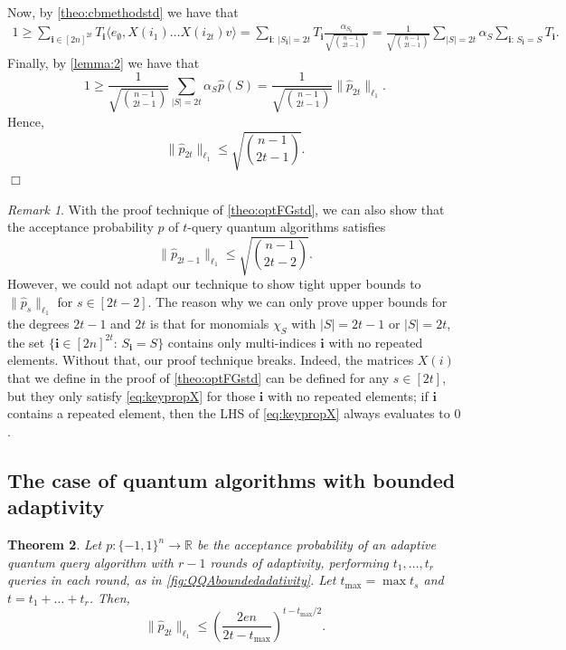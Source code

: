 \documentclass[11pt]{article}
\newcommand{\norm}[1]{\|#1\|}
\newcommand{\1}{\mathbf{1}}
\newcommand{\ind}[1]{\mathbf{#1}}
\theoremstyle{plain}
\newtheorem{theorem}{Theorem}[section]
\theoremstyle{definition}
\theoremstyle{remark}
\newtheorem{remark}[theorem]{Remark}
\renewenvironment{proof}[1][]{
    	\begin{trivlist}
     	\item[\hspace{\labelsep}{\em\noindent Proof#1:\/}]}
     	{{\hfill$\Box$}
    	\end{trivlist}
  }
\begin{document}
\begin{proof}
    Now, by \cref{theo:cbmethodstd} we have that 
    \begin{align*}
        1\geq \sum_{\ind i\in [2n]^{2t}}T_{\ind i}\langle e_{\emptyset},X(i_1)\dots X(i_{2t})v\rangle=\sum_{\ind i:\ |S_{\ind i}|=2t}T_{\ind i} \frac{\alpha_{S_{\ind i}}}{\sqrt{{n-1\choose 2t-1}}}=\frac{1}{\sqrt{{n-1\choose 2t-1}}}\sum_{|S|=2t}\alpha_S\sum_{\ind i:\, S_\ind i=S}T_{\ind i}.
    \end{align*}
    Finally, by \cref{lemma:2} we have that 
    \begin{equation*}
        1\geq \frac{1}{\sqrt{{n-1\choose 2t-1}}}\sum_{|S|=2t}\alpha_S\widehat p(S)=\frac{1}{\sqrt{{n-1\choose 2t-1}}}\norm{\widehat p_{2t}}_{\ell_1}.
    \end{equation*}
    Hence, $$\norm{\widehat p_{2t}}_{\ell_1}\leq \sqrt{{n-1\choose 2t-1}}.$$
\end{proof}
\begin{remark}\label{rem:wherebreaks}
With the proof technique of \cref{theo:optFGstd}, we can also show that the acceptance probability $p$ of $t$-query quantum algorithms satisfies
\begin{equation*}
        \norm{\widehat p_{2t-1}}_{\ell_1}\leq \sqrt{{n-1\choose 2t-2}}.
\end{equation*}
However, we could not adapt our technique to show tight upper bounds to $\norm{\widehat p_{s}}_{\ell_1}$ for $s\in [2t-2]$. The reason why we can only prove upper bounds for the degrees $2t-1$ and $2t$ is that for monomials $\chi_S$ with $|S|=2t-1$ or $|S|=2t$, the set $\{\ind i\in [2n]^{2t}:\, S_\ind i=S\}$ contains only multi-indices $\ind i$ with no repeated elements. Without that, our proof technique breaks. Indeed, the matrices $X(i)$ that we define in the proof of \cref{theo:optFGstd} can be defined for any $s\in [2t]$, but they only satisfy \cref{eq:keypropX} for those $\ind i$ with no repeated elements; if $\ind i$ contains a repeated element, then the LHS of \cref{eq:keypropX} always evaluates to $0$. 
\end{remark}
\subsection{The case of quantum algorithms with bounded adaptivity}



\begin{theorem}\label{prop:fgrowthadaptivequeriesfgrowth}
    Let $p:\{-1,1\}^n\to \mathbb{R}$ be the acceptance probability of an adaptive quantum query algorithm with $r-1$ rounds of adaptivity, performing $t_1,\dots,t_r$ queries in each round, as in \cref{fig:QQAboundedadativity}. Let $t_{\max}=\max t_s$ and $t=t_1+ \dots+t_r$. Then, 
   \begin{equation*}
        \norm{\widehat p_{2t}}_{\ell_1}\leq \left(\frac{2en}{2t- t_{\max}}\right)^{t-t_{\max}/2}.
\end{equation*}
\end{theorem}
\end{document}
